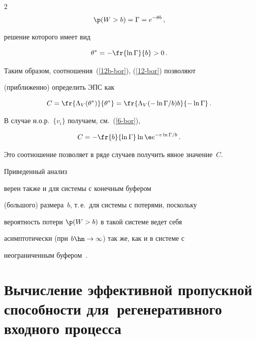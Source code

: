 \begin{multicols}{2}
 \begin{equation}

 \p(W>b)=\Gamma=e^{-\theta b}\,,\label{16a-bor}

 \end{equation}

решение которого имеет вид

\begin{equation}

 \theta^*=-\fr{\ln \Gamma}{b}>0\,. \label{12-bor}

\end{equation}

Таким образом, соотношения~(\ref{12b-bor}), (\ref{12-bor})  позволяют

(приближенно) определить ЭПС как

\begin{equation*}

C=\fr{\Lambda_V (\theta^*)}{\theta^*}=\fr{\Lambda_V(-\ln

\Gamma/b)b}{-\ln \Gamma}\,. %

\end{equation*}

В случае н.о.р.\ $\{v_i\}$ получаем, см.~(\ref{6-bor}),

\begin{equation*}

C=-\fr{b}{\ln \Gamma}\ln \e e^{-{v\ln \Gamma

}/b}\,. %

\end{equation*}

Это соотношение позволяет в ряде случаев получить явное  значение~$C$.



Приведенный  анализ

 верен также и для системы с конечным буфером

(большого) размера~$b$, т.\,е.\ для системы с потерями, поскольку

вероятность потери  $ \p(W> b)$  в такой системе ведет себя

асимптотически (при $b\hm\to \infty$) так же, как и в системе с

неограниченным буфером~\cite{Ganesh}.



\section{Вычисление  эффективной пропускной способности  для~регенеративного входного процесса}




\end{multicols}
